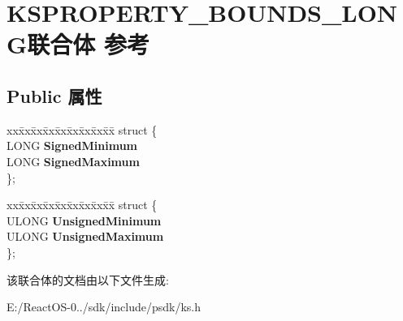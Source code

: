 \hypertarget{union_k_s_p_r_o_p_e_r_t_y___b_o_u_n_d_s___l_o_n_g}{}\section{K\+S\+P\+R\+O\+P\+E\+R\+T\+Y\+\_\+\+B\+O\+U\+N\+D\+S\+\_\+\+L\+O\+N\+G联合体 参考}
\label{union_k_s_p_r_o_p_e_r_t_y___b_o_u_n_d_s___l_o_n_g}
\subsection*{Public 属性}
\begin{DoxyCompactItemize}
\item 
\mbox{\label{union_k_s_p_r_o_p_e_r_t_y___b_o_u_n_d_s___l_o_n_g_a844d49ca21050bde0bb92de12119db39}} 
\begin{tabbing}
xx\=xx\=xx\=xx\=xx\=xx\=xx\=xx\=xx\=\kill
struct \{\\
\>LONG {\bfseries SignedMinimum}\\
\>LONG {\bfseries SignedMaximum}\\
\}; \\

\end{tabbing}\item 
\mbox{\label{union_k_s_p_r_o_p_e_r_t_y___b_o_u_n_d_s___l_o_n_g_a009b8785c40fd7c22640617c5d25d4db}} 
\begin{tabbing}
xx\=xx\=xx\=xx\=xx\=xx\=xx\=xx\=xx\=\kill
struct \{\\
\>ULONG {\bfseries UnsignedMinimum}\\
\>ULONG {\bfseries UnsignedMaximum}\\
\}; \\

\end{tabbing}\end{DoxyCompactItemize}


该联合体的文档由以下文件生成\+:\begin{DoxyCompactItemize}
\item 
E\+:/\+React\+O\+S-\/0../sdk/include/psdk/ks.\+h\end{DoxyCompactItemize}
